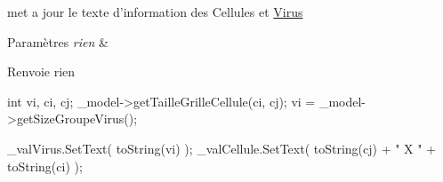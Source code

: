 met a jour le texte d'information des Cellules et \hyperlink{classVirus}{Virus} 


\begin{DoxyParams}{Paramètres}
{\em rien} & \\
\hline
\end{DoxyParams}
\begin{DoxyReturn}{Renvoie}
rien 
\end{DoxyReturn}

\begin{DoxyCode}
{
        int vi, ci, cj;
        _model->getTailleGrilleCellule(ci, cj);
        vi = _model->getSizeGroupeVirus();

        _valVirus.SetText( toString(vi)  );
        _valCellule.SetText( toString(cj) + " X " + toString(ci) );
}
\end{DoxyCode}


